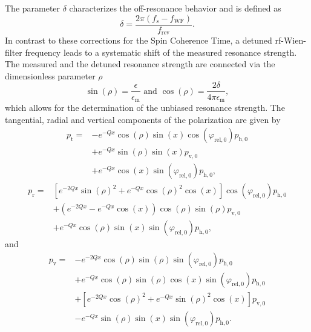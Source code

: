 \documentclass[
    10pt,
    twocolumn,
    secnumarabic,
    amssymb,
    nobibnotes,
    aps,
    prl,

    longbibliography,
    superscriptaddress
    ]{revtex4-2}
\newcommand{\phirelzero}{\varphi_{\mathrm{rel,0}}}
\newcommand{\fc}{f_\mathrm{rev} }
\newcommand{\pv}{p_\mathrm{v} }
\begin{document}
The parameter $\delta$ characterizes the off-resonance behavior and is defined as
\begin{equation}
\delta = \frac{2\pi(f_s - f_{\text{WF}})}{\fc}.  \label{eq:off_resonance_delta}
\end{equation}
In contrast to these corrections for the Spin Coherence Time, a detuned rf-Wien-filter frequency leads to a systematic shift of the measured resonance strength.
The measured and the detuned resonance strength are connected via the dimensionless parameter $\rho$
\begin{equation}
\sin(\rho) = \frac{\epsilon}{\epsilon_{\text{m}}} \text{ and } \cos(\rho) = \frac{2\delta}{4\pi\epsilon_{\text{m}}}, \label{eq:off_resonance_behaviour}
\end{equation}
which allows for the determination of the unbiased resonance strength.
The tangential, radial and vertical components of the polarization are given by
\begin{equation}
  \begin{aligned}
    p_\text{t} = &-e^{-Qx}\cos(\rho)\sin(x)\cos(\phirelzero)p_{\text{h},0}\\
          &+e^{-Qx}\sin(\rho)\sin(x)p_{\text{v},0}\\
          &+e^{-Qx}\cos(x)\sin(\phirelzero)p_{\text{h},0},
  \end{aligned}
\end{equation}
\begin{equation}
  \begin{aligned}
    p_\text{r} = & \left[e^{-2Qx}\sin(\rho)^2+e^{-Qx}\cos(\rho)^2\cos(x)\right]\cos(\phirelzero)p_{\text{h},0}\\
          &+ \left(e^{-2Qx}-e^{-Qx}\cos(x)\right)\cos(\rho)\sin(\rho)p_{\text{v},0} \\
          & + e^{-Qx}\cos(\rho)\sin(x)\sin(\phirelzero)p_{\text{h},0},
  \end{aligned}
\end{equation}
and
\begin{equation}
  \begin{aligned}
    \pv = & -e^{-2Qx}\cos(\rho)\sin(\rho)\sin(\phirelzero)p_{\text{h},0}\\
            & +e^{-Qx}\cos(\rho)\sin(\rho)\cos(x)\sin(\phirelzero)p_{\text{h},0}\\
            & + \left[e^{-2Qx}\cos(\rho)^2+e^{-Qx}\sin(\rho)^2\cos(x)\right]p_{\text{v},0} \\
            & - e^{-Qx}\sin(\rho)\sin(x)\sin(\phirelzero)p_{\text{h},0}.
  \end{aligned}
  \label{eq:pilot_bunch_vertical_component}
\end{equation}
\end{document}
